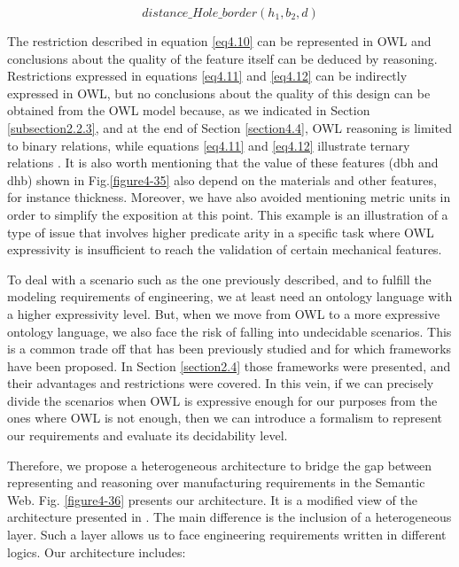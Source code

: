 \begin{equation}\label{eq4.12}
distance\_Hole\_border(h_{1}, b_{2}, d)
\end{equation}


\cbstart The restriction described in equation \ref{eq4.10} can be represented in OWL and conclusions about the quality of the feature itself can be deduced by reasoning. Restrictions expressed in equations \ref{eq4.11} and \ref{eq4.12} can be indirectly expressed in OWL, but no conclusions about the quality of this design can be obtained from the OWL model because, as we indicated in Section \ref{subsection2.2.3}, and at the end of Section \ref{section4.4}, OWL reasoning is limited to binary relations, while equations \ref{eq4.11} and \ref{eq4.12} illustrate ternary relations \cbend . It is also worth mentioning that the value of these features (dbh and dhb) shown in Fig.\ref{figure4-35} also depend on the materials and other features, for instance thickness. Moreover, we have also avoided mentioning metric units in order to simplify the exposition at this point. This example is an illustration of a type of issue that involves higher predicate arity in a specific task where OWL expressivity is insufficient to reach the validation of certain mechanical features. 


To deal with a scenario such as the one previously described, and to fulfill the modeling requirements of engineering, we at least need an ontology language with a higher expressivity level. But, when we move from OWL to a more expressive ontology language, we also face the risk of falling into undecidable scenarios. This is a common trade off that has been previously studied and for which frameworks have been proposed. In Section \ref{section2.4} those frameworks were presented, and their advantages and restrictions were covered. In this vein, if we can precisely divide the scenarios when OWL is expressive enough for our purposes from the ones where OWL is not enough, then we can introduce a formalism to represent our requirements and evaluate its decidability level.

Therefore, we propose a heterogeneous architecture to bridge the gap between representing and reasoning over manufacturing requirements in the Semantic Web.  Fig. \ref{figure4-36} presents our architecture. It is a modified view of the architecture presented in \cite{w3c_product_2005}. The main difference is  the inclusion of a heterogeneous layer. Such a layer allows us to face engineering requirements written in different logics. Our architecture includes:  

